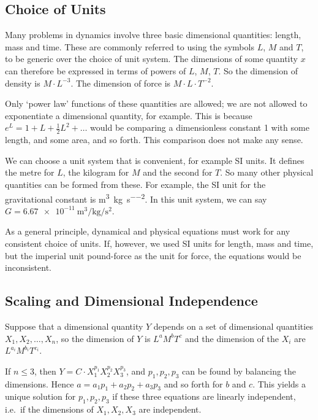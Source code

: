 \subsection{Choice of Units}
Many problems in dynamics involve three basic dimensional quantities: length, mass and time. These are commonly referred to using the symbols \(L\), \(M\) and \(T\), to be generic over the choice of unit system. The dimensions of some quantity \(x\) can therefore be expressed in terms of powers of \(L\), \(M\), \(T\). So the dimension of density is \(M \cdot L^{-3}\). The dimension of force is \(M \cdot L \cdot T^{-2}\).

Only `power law' functions of these quantities are allowed; we are not allowed to exponentiate a dimensional quantity, for example. This is because \(e^L = 1 + L + \frac{1}{2}L^2 + \dots\) would be comparing a dimensionless constant 1 with some length, and some area, and so forth. This comparison does not make any sense.

We can choose a unit system that is convenient, for example SI units. It defines the metre for \(L\), the kilogram for \(M\) and the second for \(T\). So many other physical quantities can be formed from these. For example, the SI unit for the gravitational constant is \si{\metre\cubed\per\kilogram\per\second\squared}. In this unit system, we can say \(G = \SI{6.67e-11}{\metre\cubed\per\kilogram\per\second\squared}\).

As a general principle, dynamical and physical equations must work for any consistent choice of units. If, however, we used SI units for length, mass and time, but the imperial unit pound-force as the unit for force, the equations would be inconsistent.

\subsection{Scaling and Dimensional Independence}
Suppose that a dimensional quantity \(Y\) depends on a set of dimensional quantities \(X_1, X_2, \dots, X_n\), so the dimension of \(Y\) is \(L^a M^b T^c\) and the dimension of the \(X_i\) are \(L^{a_i} M^{b_i} T^{c_i}\).

If \(n \leq 3\), then \(Y = C \cdot X_1^{p_1}X_2^{p_2}X_3^{p_3}\), and \(p_1, p_2, p_3\) can be found by balancing the dimensions. Hence \(a = a_1p_1 + a_2p_2 + a_3p_3\) and so forth for \(b\) and \(c\). This yields a unique solution for \(p_1, p_2, p_3\) if these three equations are linearly independent, i.e.\ if the dimensions of \(X_1, X_2, X_3\) are independent.

